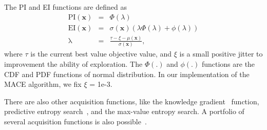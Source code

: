 The PI and EI functions are defined as
\begin{equation}
    \label{eq:PI_EI}
    \begin{array}{lll}
        \mathrm{PI}(\bm{x}) &=& \Phi(\lambda) \\
        \mathrm{EI}(\bm{x}) &=& \sigma(\bm{x}) (\lambda \Phi(\lambda) + \phi(\lambda))     \\
        \mathrm{\lambda}    &=& \displaystyle \frac{\tau - \xi - \mu(\bm{x})}{\sigma(\bm{x})},
    \end{array}
\end{equation}
where $\tau$ is the current best value objective value, and $\xi$ is a small positive jitter to improvement the ability of exploration. The $\Phi(.)$ and $\phi(.)$ functions are the CDF and PDF functions of normal distribution. In our implementation of the MACE algorithm, we fix $\xi$ = 1e-3.


There are also other acquisition functions, like the knowledge gradient~\cite{scott2011correlated} function, predictive entropy search~\cite{hernandez2014predictive}, and the max-value entropy search\cite{wang2017max}. A portfolio of several acquisition functions is also possible~\cite{hoffman2011portfolio}.
